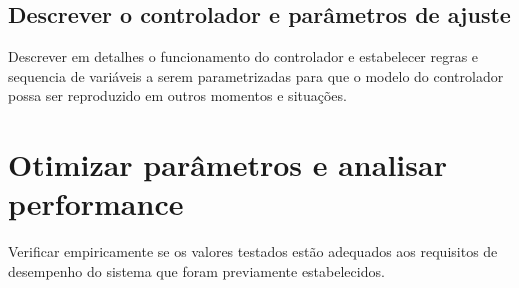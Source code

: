 \subsection{ Descrever o controlador e parâmetros de ajuste }

Descrever em detalhes o funcionamento do controlador e estabelecer regras e sequencia de variáveis a serem parametrizadas para que o modelo do controlador possa ser reproduzido em outros momentos e situações.

\section{ Otimizar parâmetros e analisar performance }

Verificar empiricamente se os valores testados estão adequados aos requisitos de desempenho do sistema que foram previamente estabelecidos. 



